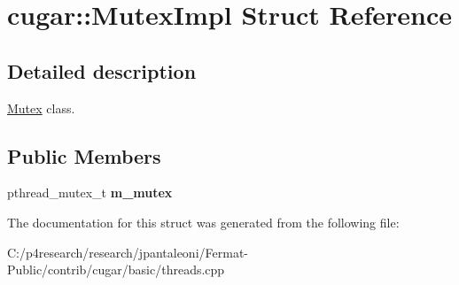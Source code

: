\hypertarget{structcugar_1_1_mutex_impl}{}\section{cugar\+:\+:Mutex\+Impl Struct Reference}
\label{structcugar_1_1_mutex_impl}


\subsection{Detailed description}
\hyperlink{classcugar_1_1_mutex}{Mutex} class. \subsection*{Public Members}
\begin{DoxyCompactItemize}
\item 
\mbox{\label{structcugar_1_1_mutex_impl_a1db4e3e48d11808fcaad2841e276a6ae}} 
pthread\+\_\+mutex\+\_\+t {\bfseries m\+\_\+mutex}
\end{DoxyCompactItemize}


The documentation for this struct was generated from the following file\+:\begin{DoxyCompactItemize}
\item 
C\+:/p4research/research/jpantaleoni/\+Fermat-\/\+Public/contrib/cugar/basic/threads.\+cpp\end{DoxyCompactItemize}
